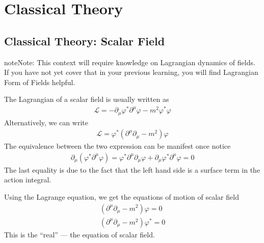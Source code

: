 \documentclass[letterpaper,10pt,english]{sphinxmanual}
\begin{document}
\chapter{Classical Theory}
\label{\detokenize{clstheo:classical-theory}}\label{\detokenize{clstheo::doc}}

\section{Classical Theory: Scalar Field}
\label{\detokenize{clstheo_scalar::doc}}\label{\detokenize{clstheo_scalar:classical-theory-scalar-field}}
\begin{sphinxadmonition}{note}{Note:}
This context will require knowledge on Lagrangian dynamics of fields. If you have not yet cover that in your previous learning, you will find Lagrangian Form of Fields helpful.
\end{sphinxadmonition}

The Lagrangian of a scalar field is usually written as
\begin{equation*}
\begin{split}\mathcal L = -\partial_\mu\varphi^*\partial^\mu\varphi - m^2\varphi^*\varphi\end{split}
\end{equation*}
Alternatively, we can write
\begin{equation*}
\begin{split}\mathcal L = \varphi^*(\partial^\mu\partial_\mu - m^2)\varphi\end{split}
\end{equation*}
The equivalence between the two expression can be manifest once notice
\begin{equation*}
\begin{split}\partial_\mu(\varphi^*\partial^\mu\varphi) = \varphi^*\partial^\mu\partial_\mu \varphi + \partial_\mu\varphi^*\partial^\mu\varphi = 0\end{split}
\end{equation*}
The last equality is due to the fact that the left hand side is a surface term in the action integral.

Using the Lagrange equation, we get the equations of motion of scalar field
\begin{equation*}
\begin{split}(\partial^\mu\partial_\mu - m^2)\varphi = 0\\
(\partial^\mu\partial_\mu - m^2)\varphi^* = 0\end{split}
\end{equation*}
This is the “real”  — the equation of scalar field.
\end{document}

